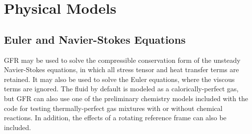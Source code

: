 \section{Physical Models}


\subsection{Euler and Navier-Stokes Equations}


GFR may be used to solve the compressible conservation form of the unsteady
Navier-Stokes equations, in which all stress tensor and heat transfer terms are
retained.
%
It may also be used to solve the Euler equations, where the viscous terms are
ignored.
%
The fluid by default is modeled as a calorically-perfect gas, but GFR can also
use one of the preliminary chemistry models included with the code for testing
thermally-perfect gas mixtures with or without chemical reactions.
%
In addition, the effects of a rotating reference frame can also be included.


